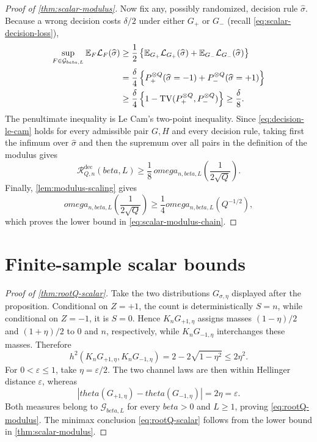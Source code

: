 \documentclass[11pt]{article}
\def\beta{beta}%
\def\theta{theta}%
\def\omega{omega}%
\newcommand{\E}{\mathbb E}
\newcommand{\TV}{\operatorname{TV}}
\newcommand{\calG}{\mathcal G}
\newcommand{\calR}{\mathcal R}
\newcommand{\eps}{\varepsilon}
\newcommand\aed[1]{{\color{magenta!60!black} #1}}
\begin{document}
\begin{proof}[Proof of \cref{thm:scalar-modulus}]
Now fix any, possibly randomized, decision rule $\widehat\sigma$.  Because a wrong decision costs $\delta/2$ under either $G_+$ or $G_-$ \aed{(recall \eqref{eq:scalar-decision-loss})},
\begin{align}
\sup_{F\in\calG_{\beta,L}}
\E_F\mathcal L_F(\widehat\sigma)
&\ge
\frac12\left\{
\E_{G_+}\mathcal L_{G_+}(\widehat\sigma)
+
\E_{G_-}\mathcal L_{G_-}(\widehat\sigma)
\right\}\notag\\
&=
\frac\delta4\left\{
P_+^{\otimes Q}(\widehat\sigma=-1)
+
P_-^{\otimes Q}(\widehat\sigma=+1)
\right\}\notag\\
&\ge
\frac\delta4
\left\{1-\TV(P_+^{\otimes Q},P_-^{\otimes Q})\right\}
\ge
\frac\delta8.
\label{eq:decision-le-cam}
\end{align}
The penultimate inequality is Le Cam's two-point inequality.  Since \eqref{eq:decision-le-cam} holds for every admissible pair $G,H$ and every decision rule, taking first the infimum over $\widehat\sigma$ and then the supremum over all pairs in the definition of the modulus gives
\[
\calR^{\mathrm{dec}}_{Q,n}(\beta,L)
\ge
\frac18\,
\omega_{n,\beta,L}\!\left(\frac{1}{2\sqrt Q}\right).
\]
Finally, \cref{lem:modulus-scaling} \aed{gives} %
\[
\omega_{n,\beta,L}\!\left(\frac{1}{2\sqrt Q}\right)
\ge
\frac14\omega_{n,\beta,L}(Q^{-1/2}),
\]
which proves the lower bound in \eqref{eq:scalar-modulus-chain}.
\end{proof}

\section{Finite-sample scalar bounds}
\label{app:finite-lower}

\begin{proof}[Proof of \cref{thm:rootQ-scalar}]
Take the two distributions $G_{\sigma,\eta}$ displayed after the proposition.  Conditional on $Z=+1$, the count is deterministically $S=n$, while conditional on $Z=-1$, it is $S=0$.  Hence $K_nG_{+1,\eta}$ assigns masses $(1-\eta)/2$ and $(1+\eta)/2$ to $0$ and $n$, respectively, while $K_nG_{-1,\eta}$ interchanges these masses.  Therefore
\[
h^2(K_nG_{+1,\eta},K_nG_{-1,\eta})
=
2-2\sqrt{1-\eta^2}
\le
2\eta^2.
\]
For $0<\eps\le1$, take $\eta=\eps/2$.  The two channel laws are then within Hellinger distance $\eps$, whereas
\[
|\theta(G_{+1,\eta})-\theta(G_{-1,\eta})|
=2\eta=\eps.
\]
Both measures belong to $\calG_{\beta,L}$ for every $\beta>0$ and $L\ge1$, proving \eqref{eq:rootQ-modulus}.  The minimax conclusion \eqref{eq:rootQ-scalar} follows from the lower bound in \cref{thm:scalar-modulus}.
\end{proof}
\end{document}
